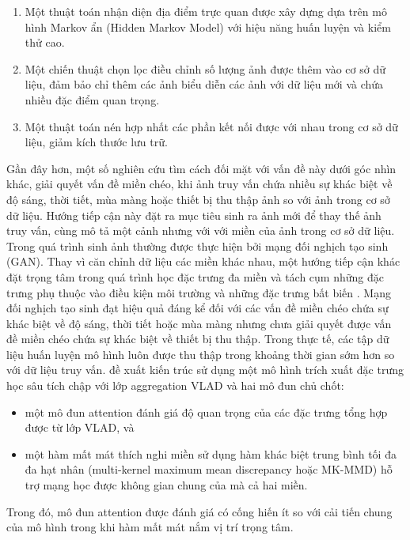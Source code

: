 \begin{enumerate}
    \item Một thuật toán nhận diện địa điểm trực quan được xây dựng dựa trên mô hình Markov ẩn (Hidden Markov Model) với hiệu năng huấn luyện và kiểm thử cao.
    \item Một chiến thuật chọn lọc điều chỉnh số lượng ảnh được thêm vào cơ sở dữ liệu, đảm bảo chỉ thêm các ảnh biểu diễn các ảnh với dữ liệu mới và chứa nhiều đặc điểm quan trọng.
    \item Một thuật toán nén hợp nhất các phần kết nối được với nhau trong cơ sở dữ liệu, giảm kích thước lưu trữ.
\end{enumerate}

Gần đây hơn, một số nghiên cứu tìm cách đối mặt với vấn đề này dưới góc nhìn khác, giải quyết vấn đề miền chéo, khi ảnh truy vấn chứa nhiều sự khác biệt về độ sáng, thời tiết, mùa màng hoặc thiết bị thu thập ảnh so với ảnh trong cơ sở dữ liệu. Hướng tiếp cận này đặt ra mục tiêu sinh ra ảnh mới để thay thế ảnh truy vấn, cùng mô tả một cảnh nhưng với với miền của ảnh trong cơ sở dữ liệu. Trong \cite{Porav2018AdversarialTF, Annosheh2019Night} quá trình sinh ảnh thường được thực hiện bởi mạng đối nghịch tạo sinh (GAN). Thay vì căn chỉnh dữ liệu các miền khác nhau, một hướng tiếp cận khác đặt trọng tâm trong quá trình học đặc trưng đa miền và tách cụm những đặc trưng phụ thuộc vào điều kiện môi trường và những đặc trưng bất biến \cite{yin2019multi}. Mạng đối nghịch tạo sinh đạt hiệu quả đáng kể đối với các vấn đề miền chéo chứa sự khác biệt về độ sáng, thời tiết hoặc mùa màng nhưng chưa giải quyết được vấn đề miền chéo chứa sự khác biệt về thiết bị thu thập. Trong thực tế, các tập dữ liệu huấn luyện mô hình luôn được thu thập trong khoảng thời gian sớm hơn so với dữ liệu truy vấn. \cite{wang2019attention} đề xuất kiến trúc sử dụng một mô hình trích xuất đặc trưng học sâu tích chập với lớp aggregation VLAD \cite{jegou2010aggregating} và hai mô đun chủ chốt:

\begin{itemize}
    \item một mô đun attention đánh giá độ quan trọng của các đặc trưng tổng hợp được từ lớp VLAD, và
    \item một hàm mất mát thích nghi miền sử dụng hàm khác biệt trung bình tối đa đa hạt nhân (multi-kernel maximum mean discrepancy hoặc MK-MMD) hỗ trợ mạng học được không gian chung của mà cả hai miền.
\end{itemize}

Trong đó, mô đun attention được đánh giá có cống hiến ít so với cải tiến chung của mô hình trong khi hàm mất mát nắm vị trí trọng tâm.

